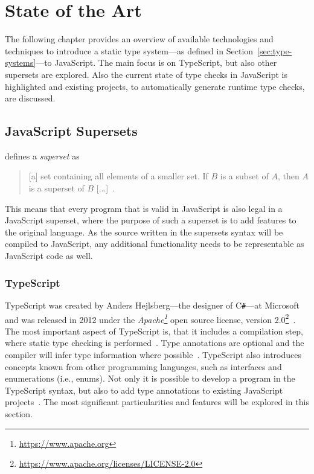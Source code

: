 \chapter{State of the Art}
\label{cha:state-of-the-art}

The following chapter provides an overview of available technologies and techniques to introduce a static type system---as defined in Section~\ref{sec:type-systems}---to JavaScript. The main focus is on TypeScript, but also other supersets are explored. Also the current state of type checks in JavaScript is highlighted and existing projects, to automatically generate runtime type checks, are discussed.

\section{JavaScript Supersets}
\label{sec:supersets}

\citeauthor{Term:Superset} defines a \emph{superset} as 
\begin{quote}
   [a] set containing all elements of a smaller set. If $B$ is a subset of $A$, then $A$ is a superset of $B$ [...]~\cite{Term:Superset}.
\end{quote}
This means that every program that is valid in JavaScript is also legal in a JavaScript superset, where the purpose of such a superset is to add features to the original language. As the source written in the supersets syntax will be compiled to JavaScript, any additional functionality needs to be representable as JavaScript code as well.

\subsection{TypeScript}
\label{sec:typescript}

TypeScript was created by Anders Hejlsberg---the designer of C\texttt{\#}---at Microsoft~\cite[p.~10]{MasteringTypeScript:Rozentals:2017} and was released in 2012 under the \emph{Apache\footnote{\url{https://www.apache.org}}} open source license, version 2.0\footnote{\url{https://www.apache.org/licenses/LICENSE-2.0}}~\cite[p.~xix]{ProTypeScript:Fenton:2014}. The most important aspect of TypeScript is, that it includes a compilation step, where static type checking is performed~\cite[p.~11]{MasteringTypeScript:Rozentals:2017}. Type annotations are optional and the compiler will infer type information where possible~\cite[p.~10]{TypeScriptBook:Syed:2017}. TypeScript also introduces concepts known from other programming languages, such as interfaces and enumerations (i.e., enums). Not only it is possible to develop a program in the TypeScript syntax, but also to add type annotations to existing JavaScript projects~\cite[p.~13]{MasteringTypeScript:Rozentals:2017}. The most significant particularities and features will be explored in this section.

